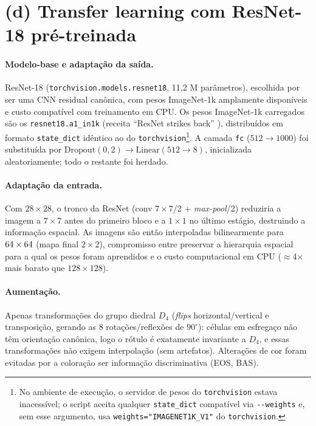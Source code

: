 \documentclass[10pt,a4paper]{article}
\begin{document}
\section{(d) Transfer learning com ResNet-18 pré-treinada}\label{sec:tl}
\paragraph{Modelo-base e adaptação da saída.} ResNet-18 \cite{he2016} (\texttt{torchvision.models.resnet18},
11,2 M parâmetros), escolhida por ser uma CNN residual canônica, com pesos ImageNet-1k amplamente disponíveis e
custo compatível com treinamento em CPU. Os pesos ImageNet-1k carregados são os
\texttt{resnet18.a1\_in1k} (receita ``ResNet strikes back'' \cite{wightman2021}), distribuídos em formato
\texttt{state\_dict} idêntico ao do \texttt{torchvision}\footnote{No ambiente de execução, o servidor de pesos
do \texttt{torchvision} estava inacessível; o script aceita qualquer \texttt{state\_dict} compatível via
\texttt{-{}-weights} e, sem esse argumento, usa \texttt{weights="IMAGENET1K\_V1"} do \texttt{torchvision}.}.
A camada \texttt{fc} ($512\to1000$) foi substituída por $\mathrm{Dropout}(0{,}2)\to\mathrm{Linear}(512\to8)$,
inicializada aleatoriamente; todo o restante foi herdado.

\paragraph{Adaptação da entrada.} Com $28\times28$, o tronco da ResNet (conv $7\times7$/2 + \emph{max-pool}/2)
reduziria a imagem a $7\times7$ antes do primeiro bloco e a $1\times1$ no último estágio, destruindo a
informação espacial. As imagens são então interpoladas bilinearmente para $64\times64$ (mapa final
$2\times2$), compromisso entre preservar a hierarquia espacial para a qual os pesos foram aprendidos e o custo
computacional em CPU ($\approx$4$\times$ mais barato que $128\times128$).

\paragraph{Aumentação.} Apenas transformações do grupo diedral $D_4$ (\emph{flips} horizontal/vertical e
transposição, gerando as 8 rotações/reflexões de $90^\circ$): células em esfregaço não têm orientação
canônica, logo o rótulo é exatamente invariante a $D_4$, e essas transformações não exigem interpolação
(sem artefatos). Alterações de cor foram evitadas por a coloração ser informação discriminativa (EOS, BAS).
\end{document}
